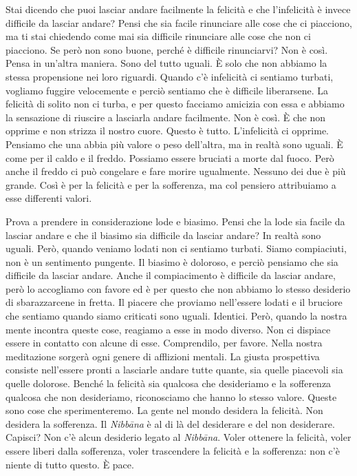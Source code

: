 Stai dicendo che puoi lasciar andare facilmente la felicità e che
l'infelicità è invece difficile da lasciar andare? Pensi che sia facile
rinunciare alle cose che ci piacciono, ma ti stai chiedendo come mai sia
difficile rinunciare alle cose che non ci piacciono. Se però non sono
buone, perché è difficile rinunciarvi? Non è così. Pensa in un'altra
maniera. Sono del tutto uguali. È solo che non abbiamo la stessa
propensione nei loro riguardi. Quando c'è infelicità ci sentiamo
turbati, vogliamo fuggire velocemente e perciò sentiamo che è difficile
liberarsene. La felicità di solito non ci turba, e per questo facciamo
amicizia con essa e abbiamo la sensazione di riuscire a lasciarla andare
facilmente. Non è così. È che non opprime e non strizza il nostro cuore.
Questo è tutto. L'infelicità ci opprime. Pensiamo che una abbia più
valore o peso dell'altra, ma in realtà sono uguali. È come per il caldo
e il freddo. Possiamo essere bruciati a morte dal fuoco. Però anche il
freddo ci può congelare e fare morire ugualmente. Nessuno dei due è più
grande. Così è per la felicità e per la sofferenza, ma col pensiero
attribuiamo a esse differenti valori.

Prova a prendere in considerazione lode e biasimo. Pensi che la lode sia
facile da lasciar andare e che il biasimo sia difficile da lasciar
andare? In realtà sono uguali. Però, quando veniamo lodati non ci
sentiamo turbati. Siamo compiaciuti, non è un sentimento pungente. Il
biasimo è doloroso, e perciò pensiamo che sia difficile da lasciar
andare. Anche il compiacimento è difficile da lasciar andare, però lo
accogliamo con favore ed è per questo che non abbiamo lo stesso
desiderio di sbarazzarcene in fretta. Il piacere che proviamo
nell'essere lodati e il bruciore che sentiamo quando siamo criticati
sono uguali. Identici. Però, quando la nostra mente incontra queste
cose, reagiamo a esse in modo diverso. Non ci dispiace essere in
contatto con alcune di esse. Comprendilo, per favore. Nella nostra
meditazione sorgerà ogni genere di afflizioni mentali. La giusta
prospettiva consiste nell'essere pronti a lasciarle andare tutte quante,
sia quelle piacevoli sia quelle dolorose. Benché la felicità sia
qualcosa che desideriamo e la sofferenza qualcosa che non desideriamo,
riconosciamo che hanno lo stesso valore. Queste sono cose che
sperimenteremo. La gente nel mondo desidera la felicità. Non desidera la
sofferenza. Il \emph{Nibbāna} è al di là del desiderare e del non
desiderare. Capisci? Non c'è alcun desiderio legato al \emph{Nibbāna}.
Voler ottenere la felicità, voler essere liberi dalla sofferenza, voler
trascendere la felicità e la sofferenza: non c'è niente di tutto questo.
È pace.

